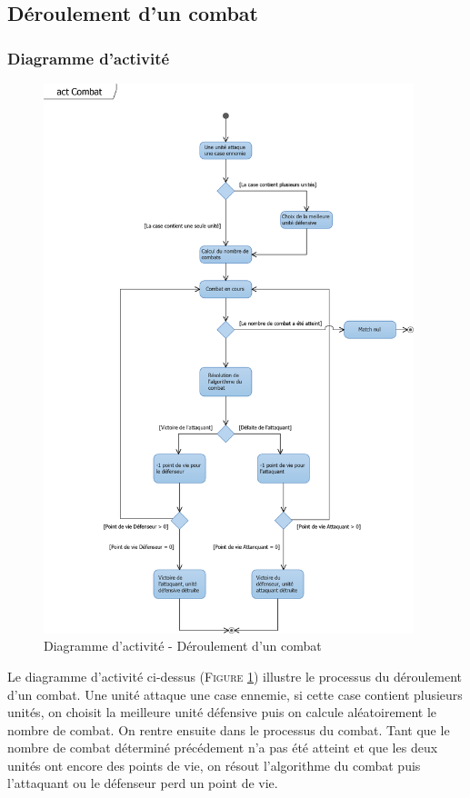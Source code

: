 \documentclass[a4paper,11pt]{article}
\begin{document}
	\subsection{Déroulement d'un combat}
		\subsubsection{Diagramme d'activité}
		\begin{figure}[ht!]
			\includegraphics[height=16cm]{Diagrammes/Combat/actCombat.png}
			\caption{Diagramme d'activité - Déroulement d'un combat}
			\label{fig:actcombat}
		\end{figure}
		\vspace*{1cm}
		Le diagramme d'activité ci-dessus (\textsc{Figure \ref{fig:actcombat}}) illustre le processus du déroulement d'un combat. Une unité attaque une case ennemie, si cette case contient plusieurs unités, on choisit la meilleure unité défensive puis on calcule aléatoirement le nombre de combat. On rentre ensuite dans le processus du combat. Tant que le nombre de combat déterminé précédement n'a pas été atteint et que les deux unités ont encore des points de vie, on résout l'algorithme du combat puis l'attaquant ou le défenseur perd un point de vie.
		\newpage
\end{document}
